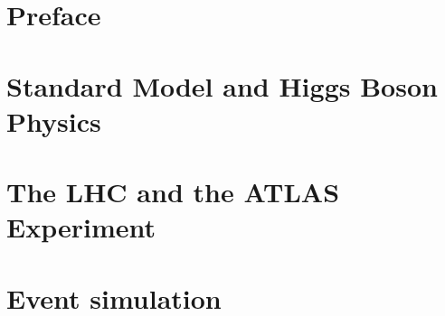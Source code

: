 \documentclass[11pt,twoside]{book}
\begin{document}
\pagestyle{empty}


\cleardoublepage



\cleardoublepage

\cleardoublepage

\restoregeometry

\pagestyle{fancy}


\hypersetup{linkcolor=black}
\tableofcontents
\clearpage
\hypersetup{linkcolor=blue}


\clearpage



\newpage

\setlength{\parindent}{15pt} %
\setlength{\parskip}{1.2mm plus 0.1mm} %




\chapter*{Preface}
\label{chap:preface}


\cleardoublepage
\chapter{Standard Model and Higgs Boson Physics}
\label{chap:intro}


\chapter{The LHC and the ATLAS Experiment}
\label{chap:ATLAS}


\chapter{Event simulation}
\label{chap:dataset}

\end{document}
